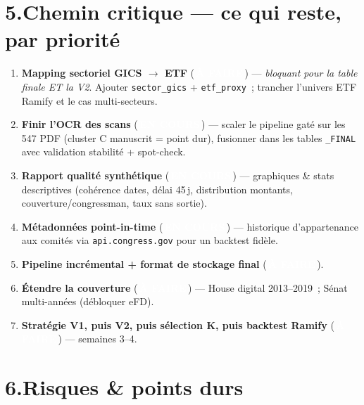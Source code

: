 \documentclass[11pt,a4paper]{article}
\newcommand{\file}[1]{\texttt{\small #1}}
\newcommand{\badge}[2]{\colorbox{#1}{\textcolor{white}{\scriptsize\textbf{\,#2\,}}}}
\newcommand{\ENCOURS}{\badge{warn}{EN COURS}}
\newcommand{\AFAIRE}{\badge{todo}{\`A FAIRE}}
\begin{document}
\section*{5.\quad Chemin critique --- ce qui reste, par priorit\'e}

\begin{enumerate}[leftmargin=1.8em]
\item \textbf{Mapping sectoriel GICS $\to$ ETF} (\AFAIRE) --- \emph{bloquant pour la table finale ET
la V2}. Ajouter \file{sector\_gics} + \file{etf\_proxy}~; trancher l'univers ETF Ramify et le cas
multi-secteurs.
\item \textbf{Finir l'OCR des scans} (\ENCOURS) --- scaler le pipeline gat\'e sur les 547 PDF
(cluster C manuscrit = point dur), fusionner dans les tables \file{\_FINAL} avec validation
stabilit\'e + spot-check.
\item \textbf{Rapport qualit\'e synth\'etique} (\ENCOURS) --- graphiques \& stats descriptives
(coh\'erence dates, d\'elai 45\,j, distribution montants, couverture/congressman, taux sans sortie).
\item \textbf{M\'etadonn\'ees point-in-time} (\ENCOURS) --- historique d'appartenance aux comit\'es
via \file{api.congress.gov} pour un backtest fid\`ele.
\item \textbf{Pipeline incr\'emental + format de stockage final} (\AFAIRE).
\item \textbf{\'Etendre la couverture} (\AFAIRE) --- House digital 2013--2019~; S\'enat multi-ann\'ees
(d\'ebloquer eFD).
\item \textbf{Strat\'egie V1, puis V2, puis s\'election K, puis backtest Ramify} (\AFAIRE) ---
semaines 3--4.
\end{enumerate}

\section*{6.\quad Risques \& points durs}
\end{document}
